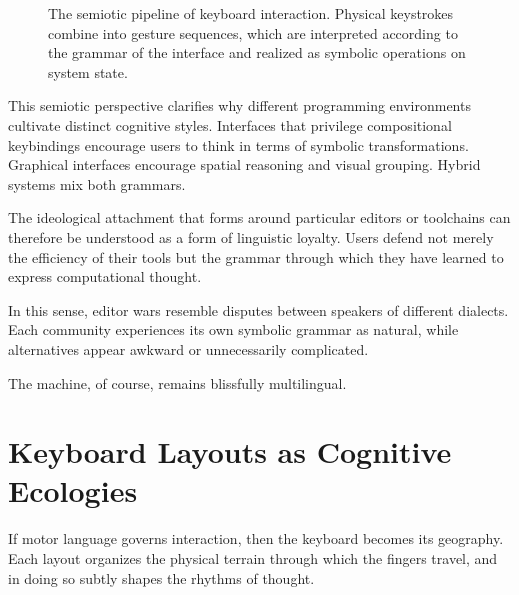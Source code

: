 \documentclass[11pt]{article}
\theoremstyle{definition}
\begin{document}
\begin{figure}[h]
\centering
{}
\caption{The semiotic pipeline of keyboard interaction. Physical
keystrokes combine into gesture sequences, which are interpreted
according to the grammar of the interface and realized as symbolic
operations on system state.}
\label{fig:keybinding_semiotics}
\end{figure}

This semiotic perspective clarifies why different programming
environments cultivate distinct cognitive styles. Interfaces that
privilege compositional keybindings encourage users to think in terms
of symbolic transformations. Graphical interfaces encourage spatial
reasoning and visual grouping. Hybrid systems mix both grammars.

The ideological attachment that forms around particular editors or
toolchains can therefore be understood as a form of linguistic loyalty.
Users defend not merely the efficiency of their tools but the grammar
through which they have learned to express computational thought.

In this sense, editor wars resemble disputes between speakers of
different dialects. Each community experiences its own symbolic grammar
as natural, while alternatives appear awkward or unnecessarily
complicated.

The machine, of course, remains blissfully multilingual.

\section{Keyboard Layouts as Cognitive Ecologies}

If motor language governs interaction, then the keyboard becomes its
geography. Each layout organizes the physical terrain through which the
fingers travel, and in doing so subtly shapes the rhythms of thought.
\end{document}

